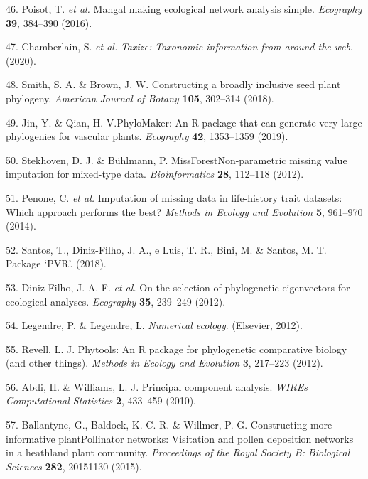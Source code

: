 \documentclass[12pt,a4paper,]{article}
\begin{document}
\hypertarget{ref-poisot2016}{}
46. Poisot, T. \emph{et al.} Mangal making ecological network analysis
simple. \emph{Ecography} \textbf{39}, 384--390 (2016).

\hypertarget{ref-chamberlain2020}{}
47. Chamberlain, S. \emph{et al.} \emph{Taxize: Taxonomic information
from around the web}. (2020).

\hypertarget{ref-smith2018}{}
48. Smith, S. A. \& Brown, J. W. Constructing a broadly inclusive seed
plant phylogeny. \emph{American Journal of Botany} \textbf{105},
302--314 (2018).

\hypertarget{ref-jin2019}{}
49. Jin, Y. \& Qian, H. V.PhyloMaker: An R package that can generate
very large phylogenies for vascular plants. \emph{Ecography}
\textbf{42}, 1353--1359 (2019).

\hypertarget{ref-stekhoven2012}{}
50. Stekhoven, D. J. \& Bühlmann, P. MissForestNon-parametric missing
value imputation for mixed-type data. \emph{Bioinformatics} \textbf{28},
112--118 (2012).

\hypertarget{ref-penone2014}{}
51. Penone, C. \emph{et al.} Imputation of missing data in life-history
trait datasets: Which approach performs the best? \emph{Methods in
Ecology and Evolution} \textbf{5}, 961--970 (2014).

\hypertarget{ref-santos2018}{}
52. Santos, T., Diniz-Filho, J. A., e Luis, T. R., Bini, M. \& Santos,
M. T. Package `PVR'. (2018).

\hypertarget{ref-diniz-filho2012}{}
53. Diniz-Filho, J. A. F. \emph{et al.} On the selection of phylogenetic
eigenvectors for ecological analyses. \emph{Ecography} \textbf{35},
239--249 (2012).

\hypertarget{ref-legendre2012}{}
54. Legendre, P. \& Legendre, L. \emph{Numerical ecology}. (Elsevier,
2012).

\hypertarget{ref-revell2012}{}
55. Revell, L. J. Phytools: An R package for phylogenetic comparative
biology (and other things). \emph{Methods in Ecology and Evolution}
\textbf{3}, 217--223 (2012).

\hypertarget{ref-abdi2010}{}
56. Abdi, H. \& Williams, L. J. Principal component analysis.
\emph{WIREs Computational Statistics} \textbf{2}, 433--459 (2010).

\hypertarget{ref-ballantyne2015}{}
57. Ballantyne, G., Baldock, K. C. R. \& Willmer, P. G. Constructing
more informative plantPollinator networks: Visitation and pollen
deposition networks in a heathland plant community. \emph{Proceedings of
the Royal Society B: Biological Sciences} \textbf{282}, 20151130 (2015).
\end{document}
